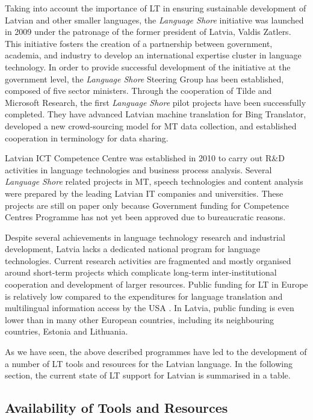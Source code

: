\begin{multicols}{2}
Taking into account the importance of LT in ensuring sustainable development of Latvian and other smaller languages, the \textit{Language Shore} initiative was launched in 2009 under the patronage of the former president of Latvia, Valdis Zatlers.
This initiative fosters the creation of a partnership between government, academia, and industry to develop an international expertise cluster in language technology.
In order to provide successful development of the initiative at the government level, the \textit{Language Shore} Steering Group has been established, composed of five sector ministers.
Through the cooperation of Tilde and Microsoft Research, the first \textit{Language Shore} pilot projects have been successfully completed.
They have advanced Latvian machine translation for Bing Translator, developed a new crowd-sourcing model for MT data collection, and established cooperation in terminology for data sharing. 

Latvian ICT Competence Centre was established in 2010 to carry out R\&D activities in language technologies and business process analysis.
Several \textit{Language Shore} related projects in MT, speech technologies and content analysis were prepared by the leading Latvian IT companies and universities.
These projects are still on paper only because Government funding for Competence Centres Programme has not yet been approved due to bureaucratic reasons.

Despite several achievements in language technology research and industrial development, Latvia lacks a dedicated national program for language technologies.
Current research activities are fragmented and mostly organised around short-term projects which complicate long-term inter-institutional cooperation and development of larger resources.
Public funding for LT in Europe is relatively low compared to the expenditures for language translation and multilingual information access by the USA \cite{Meta46}.
In Latvia, public funding is even lower than in many other European countries, including its neighbouring countries, Estonia and Lithuania.

As we have seen, the above described programmes have led to the development of a number of LT tools and resources for the Latvian language.
In the following section, the current state of LT support for Latvian is summarised in a table. 

\subsection{Availability of Tools and Resources}


\end{multicols}
